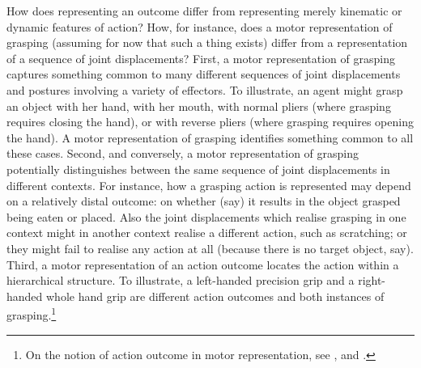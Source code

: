 \documentclass[12pt,\papersize]{extarticle}
\begin{document}
How does representing an outcome differ from representing merely kinematic or dynamic features of action? How, for instance, does a motor representation of grasping (assuming for now that such a thing exists) differ from a representation of a sequence of joint displacements? First, a motor representation of grasping captures something common to many different sequences of joint displacements and postures involving a variety of effectors. To illustrate, an agent might grasp an object with her hand, with her mouth, with normal pliers (where grasping requires closing the hand), or with reverse pliers (where grasping requires opening the hand). A motor representation of grasping identifies something common to all these cases. Second, and conversely, a motor representation of grasping potentially distinguishes between the same sequence of joint displacements in different contexts. For instance, how a grasping action is represented may depend on a relatively distal outcome: on whether (say) it results in the object grasped being eaten or placed. Also the joint displacements which realise grasping in one context might in another context realise a different action, such as scratching; or they might fail to realise any action at all (because there is no target object, say). Third, a motor representation of an action outcome locates the action within a hierarchical structure. To illustrate, a left-handed precision grip and a right-handed whole hand grip are different action outcomes and both instances of grasping.\footnote{On the notion of action outcome in motor representation, see \citet{gallese:2000_inner}, \citet{jeannerod_motor_2006} and \citet{rizzolatti_mirrors_2008}.}  
\end{document}
